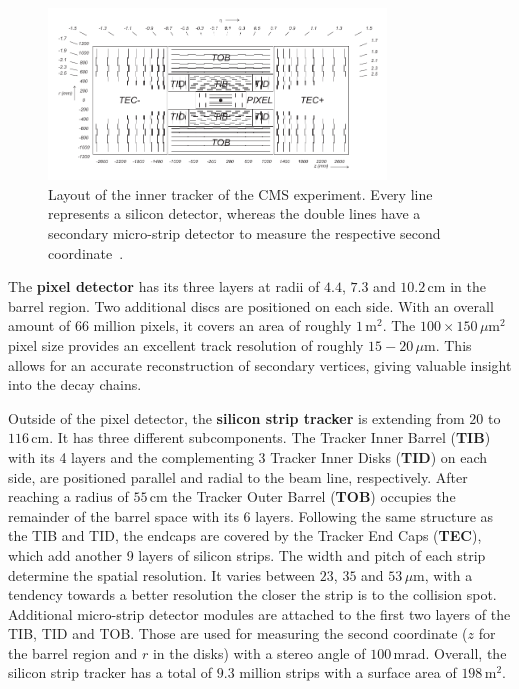 \begin{figure}[ht!]
  \centering
  \includegraphics[width=0.8\textwidth]{plots/innertracker.pdf}
  \caption{Layout of the inner tracker of the CMS experiment. Every line represents a silicon detector, whereas the double lines have a secondary micro-strip detector to measure the respective second coordinate~\cite{cmsjinst}.}
  \label{fig:inntrk}
\end{figure}

The \textbf{pixel detector} has its three layers at radii of $4.4$, $7.3$ and $10.2\,\text{cm}$ in the barrel region. Two additional discs are positioned on each side. With an overall amount of $66$ million pixels, it covers an area of roughly $1\,\text{m}^2$. The $100 \times 150\,\mu\text{m}^2$ pixel size provides an excellent track resolution of roughly $15-20\,\mu\text{m}$. This allows for an accurate reconstruction of secondary vertices, giving valuable insight into the decay chains.

Outside of the pixel detector, the \textbf{silicon strip tracker} is extending from $20$ to $116\,\text{cm}$. It has three different subcomponents. The Tracker Inner Barrel (\textbf{TIB}) with its 4 layers and the complementing 3 Tracker Inner Disks (\textbf{TID}) on each side, are positioned parallel and radial to the beam line, respectively. After reaching a radius of $55\,\text{cm}$ the Tracker Outer Barrel (\textbf{TOB}) occupies the remainder of the barrel space with its 6 layers. Following the same structure as the TIB and TID, the endcaps are covered by the Tracker End Caps (\textbf{TEC}), which add another 9 layers of silicon strips. The width and pitch of each strip determine the spatial resolution. It varies between $23$, $35$ and $53\,\mu\text{m}$, with a tendency towards a better resolution the closer the strip is to the collision spot. Additional micro-strip detector modules are attached to the first two layers of the TIB, TID and TOB. Those are used for measuring the second coordinate ($z$ for the barrel region and $r$ in the disks) with a stereo angle of $100\,\text{mrad}$. Overall, the silicon strip tracker has a total of $9.3$ million strips with a surface area of $198\,\text{m}^2$.

